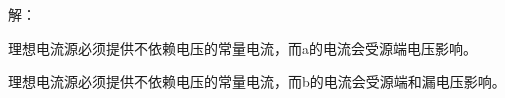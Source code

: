 






解：



\scalebox{3}{（a）}





理想电流源必须提供不依赖电压的常量电流，而a的电流会受源端电压影响。










\scalebox{3}{（b）}





理想电流源必须提供不依赖电压的常量电流，而b的电流会受源端和漏电压影响。









